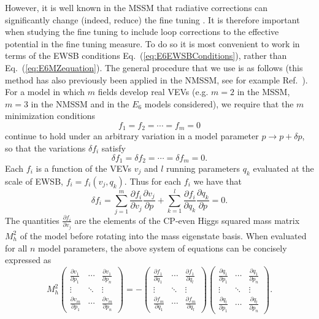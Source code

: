 \documentclass[preprint,amsmath,amssymb,aps,superscriptaddress,prd,
showpacs,floatfix,nofootinbib]{revtex4-1}
\begin{document}
However, it is well known in the MSSM that radiative corrections can
significantly change (indeed, reduce) the fine tuning \cite{Cassel:2010px}.
It is therefore important when studying the fine tuning to include loop
corrections to the effective potential in the fine tuning measure.  To do so
it is most convenient to work in terms of the EWSB conditions
Eq.~(\ref{eq:E6EWSBConditions}), rather than Eq.~(\ref{eq:E6MZequation}).
The general procedure that we use is as follows (this method has also
previously been applied in the NMSSM, see for example
Ref.~\cite{Ellwanger:2011mu}).  For a model in which $m$ fields develop real
VEVs (e.g. $m=2$ in the MSSM, $m=3$ in the NMSSM and in the $E_6$
models considered), we require that the $m$ minimization conditions
\begin{equation} \label{eq:EWSBconditions}
f_1 = f_2 = \dotsb = f_m = 0
\end{equation}
continue to hold under an arbitrary variation in a model parameter
$p \rightarrow p + \delta p$, so that the variations $\delta f_i$ satisfy
\begin{equation} \label{eq:EWSBvariations}
\delta f_1 = \delta f_2 = \dotsb = \delta f_m = 0 .
\end{equation}
Each $f_i$ is a function of the VEVs $v_j$ and $l$ running parameters
$q_k$ evaluated at the scale of EWSB, $f_i = f_i(v_j , q_k)$.  Thus for
each $f_i$ we have that
\begin{equation} \label{eq:EWSBchainrule}
\delta f_i = \sum_{j=1}^m \frac{\partial f_i}{\partial v_j}
\frac{\partial v_j}{\partial p} + \sum_{k=1}^l \frac{\partial f_i}
{\partial q_k} \frac{\partial q_k}{\partial p} = 0 .
\end{equation}
The quantities $\frac{\partial f_i}{\partial v_j}$ are the elements of
the CP-even Higgs squared mass matrix $M_h^2$ of the model before
rotating into the mass eigenstate basis.  When evaluated for all $n$
model parameters, the above system of equations can be concisely
expressed as
\begin{equation} \label{eq:tuningsystem}
M_h^2 \begin{pmatrix}
\frac{\partial v_1}{\partial p_1} & \cdots &
\frac{\partial v_1}{\partial p_n} \\
\vdots & \ddots & \vdots \\
\frac{\partial v_m}{\partial p_1} & \cdots & \frac{\partial v_m}{\partial p_n}
\end{pmatrix} = -\begin{pmatrix}
\frac{\partial f_1}{\partial q_1} & \cdots & \frac{\partial f_1}
{\partial q_l} \\
\vdots & \ddots & \vdots \\
\frac{\partial f_m}{\partial q_1} & \cdots & \frac{\partial f_m}{\partial q_l}
\end{pmatrix}
\begin{pmatrix}
\frac{\partial q_1}{\partial p_1} & \cdots & \frac{\partial q_1}
{\partial p_n} \\
\vdots & \ddots & \vdots \\
\frac{\partial q_l}{\partial p_1} & \cdots & \frac{\partial q_l}{\partial p_n}
\end{pmatrix} .
\end{equation}
\end{document}

